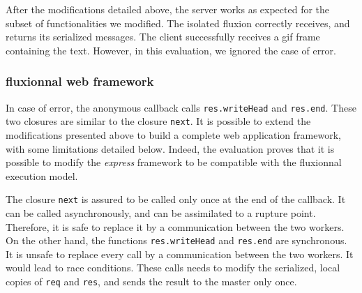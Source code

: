After the modifications detailed above, the server works as expected for the subset of functionalities we modified.
The isolated fluxion correctly receives, and returns its serialized messages.
The client successfully receives a gif frame containing the text.
However, in this evaluation, we ignored the case of error.

\subsubsection{fluxionnal web framework}

In case of error, the anonymous callback calls \texttt{res.writeHead} and \texttt{res.end}.
These two closures are similar to the closure \texttt{next}.
It is possible to extend the modifications presented above to build a complete web application framework, with some limitations detailed below.
Indeed, the evaluation proves that it is possible to modify the \textit{express} framework to be compatible with the fluxionnal execution model.

The closure \texttt{next} is assured to be called only once at the end of the callback.
It can be called asynchronously, and can be assimilated to a rupture point.
Therefore, it is safe to replace it by a communication between the two workers.
On the other hand, the functions \texttt{res.writeHead} and \texttt{res.end} are synchronous.
It is unsafe to replace every call by a communication between the two workers.
It would lead to race conditions.
These calls needs to modify the serialized, local copies of \texttt{req} and \texttt{res}, and sends the result to the master only once.
